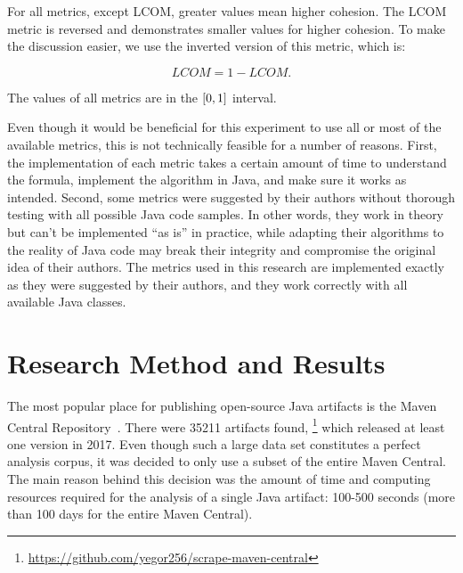 \documentclass[sigconf,10pt,nonacm=true]{acmart}
\begin{document}
For all metrics, except LCOM, greater values mean higher cohesion. The LCOM
metric is reversed and demonstrates smaller values for higher cohesion.
To make the discussion easier, we use the inverted version of this metric,
which is:

\begin{equation}
\mathit{LCOM} = 1 - \mathit{LCOM}.
\end{equation}

The values of all metrics are in the $\interval{0}{1}$ interval.

Even though it would be beneficial for this experiment to use all or most
of the available metrics, this is not technically feasible for a number
of reasons. First, the implementation of each metric takes a certain amount of time to understand
the formula, implement the algorithm in Java, and make sure it works as intended.
Second, some metrics were suggested by their authors without thorough testing
with all possible Java code samples. In other words, they work in theory
but can't be implemented ``as is'' in practice, while adapting their
algorithms to the reality of Java code may break their integrity and compromise the
original idea of their authors. The metrics used in this research are implemented
exactly as they were suggested by their authors, and they work correctly with
all available Java classes.

\section{Research Method and Results}

The most popular place for publishing open-source Java artifacts
is the Maven Central Repository~\citep{miller10}.
There were 35211 artifacts found,%
\footnote{\url{https://github.com/yegor256/scrape-maven-central}}
which released at least one version in 2017.
Even though such a large data set constitutes a perfect analysis corpus,
it was decided to only use a subset of the entire Maven Central.
The main reason behind this decision was the amount of time
and computing resources required for the analysis of a single
Java artifact: 100-500 seconds (more than 100 days for the entire Maven Central).
\end{document}
